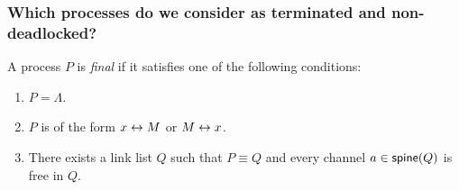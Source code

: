 \documentclass[11pt, aspectratio=169, xcolor={dvipsnames}, usepdftitle=false]{beamer}
\begin{document}
\begin{frame}[fragile]
  \frametitle{Which processes do we consider as terminated and non-deadlocked?}
  \begin{definition}
    A process $P$ is \emph{final} if it satisfies one of the following conditions:
    \begin{enumerate}[label=(\roman*)]
      \item $P = \Lambda$.
      \item $P$ is of the form $x \leftrightarrow M$ or $M \leftrightarrow x$.
      \item There exists a link list $Q$ such that $P \equiv Q$ and
            every channel $a \in \mathsf{spine}(Q)$ is free in $Q$.
    \end{enumerate}
  \end{definition}
\end{frame}
\end{document}
